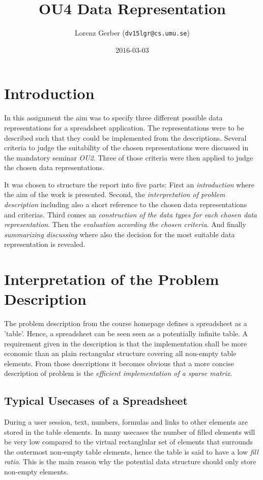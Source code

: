 \documentclass[a4paper,11pt,twoside]{article}
\title{OU4 Data Representation}
\author{Lorenz Gerber ({\tt{dv15lgr@cs.umu.se}})}
\date{2016-03-03}
\begin{document}
\lstset{language=C}
\maketitle

\tableofcontents
\newpage

\section{Introduction} 
In this assignment the aim was to specify three different possible
data representations for a spreadsheet application. The
representations were to be described such that they could be implemented
from the descriptions. Several criteria to judge the suitability of
the chosen representations were discussed in the mandatory seminar
\emph{OU2}. Three of those criteria were then applied to judge the
chosen data representations.

It was chosen to structure the report into five parts: First an
\emph{introduction} where the aim of the work is presented. Second, the
\emph{interpretation of problem description} including also a short
reference to the chosen data representations and criterias. Third
comes an \emph{construction of the data types for each chosen data
  representation}. Then the \emph{evaluation according the chosen
  criteria}. And finally \emph{summarizing discussing} where also the
decision for the most suitable data representation is revealed.


\section{Interpretation of the Problem Description}
The problem description from the course homepage defines a spreadsheet
as a 'table'. Hence, a spreadsheet can be seen seen as a potentially
infinite table. A requirement given in the description is that the
implementation shall be more economic than an plain rectangular
structure covering all non-empty table elements. From those
descriptions it becomes obvious that a more concise description of
problem is the \emph{efficient implementation of a sparse matrix}. 

\subsection{Typical Usecases of a Spreadsheet}
During a user session, text, numbers, formulas and links to
other elements are stored in the table elements. In many usecases the
number of filled elements will be very low compared to the virtual
rectanglular set of elements that surrounds the outermost non-empty
table elements, hence the table is said to have a low \emph{fill
 ratio}. This is the main reason why the potential data structure
should only store non-empty elements.
\end{document}

